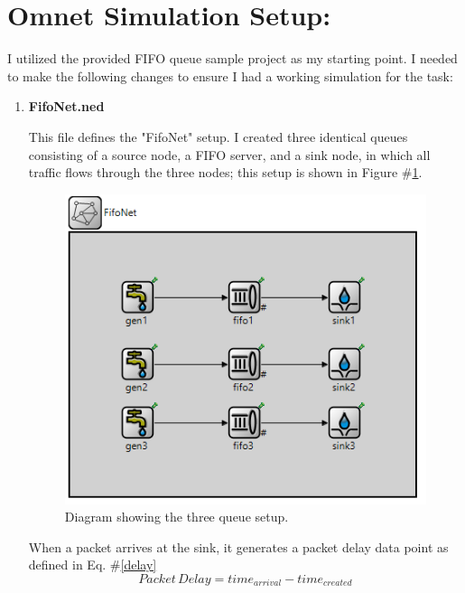 \documentclass{article}
\begin{document}

\section*{Omnet Simulation Setup:}
I utilized the provided FIFO queue sample project as my starting point.
I needed to make the following changes to ensure I had a working simulation for the task:

\begin{enumerate}
	\item \textbf{FifoNet.ned}  

This file defines the "FifoNet" setup.  I created three identical queues consisting of a source node, a FIFO server, and a sink node, in which all traffic flows through the three nodes; this setup is shown in Figure \#\ref{diagram}.  

\begin{figure}[h!]
	\begin{center}
	\includegraphics[scale=1.0]{Images/FifoNet.PNG}
	\vspace{-.25cm}
	\caption{Diagram showing the three queue setup.}
	\label{diagram}
	\end{center}
\end{figure}

When a packet arrives at the sink, it generates a packet delay data point as defined in Eq. \#\ref{delay}
\begin{equation}
	\label{delay}
	Packet \, Delay = time_{arrival} - time_{created}
\end{equation}


\end{enumerate}
\end{document}

